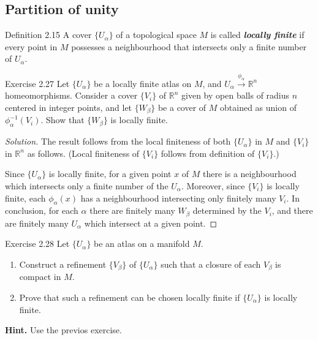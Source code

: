 \subsection{Partition of unity}

\begin{thing3}{Definition 2.15}\label{def:2.15}\leavevmode
A cover \(\{U_\alpha\}\) of a topological space \(M\) is called \textit{\textbf{locally finite}} if every point in \(M\) possesses a neighbourhood that intersects only a finite number of \(U_\alpha\).
\end{thing3}

\begin{thing4}{Exercise 2.27}\label{exer:2.27}\leavevmode
Let \(\{U_\alpha\}\) be a locally finite atlas on \(M\), and \(U_\alpha\xrightarrow{\phi_\alpha}\mathbb{R}^n\) homeomorphisms. Consider a cover \(\{V_i\}\) of \( \mathbb{R}^n\) given by open balls of radius $n$ centered in integer points, and let \(\{ W_\beta\}\) be a cover of \(M\) obtained as union of \(\phi^{-1}_\alpha(V_i)\). Show that \(\{W_\beta\}\) is locally finite.
\end{thing4}

\begin{proof}[Solution]\leavevmode
 The result follows from the local finiteness of both \(\{U_\alpha\}\) in \(M\) and \(\{V_i\}\) in \(\mathbb{R}^n\) as follows. (Local finiteness of \(\{V_i\}\) follows from definition of \(\{V_i\}\).)

Since \(\{U_\alpha\}\) is locally finite, for a given point $x$ of \(M\) there is a neighbourhood which intersects only a finite number of the \(U_\alpha\). Moreover, since  \(\{V_i\}\) is locally finite, each \(\phi_\alpha(x)\) has a neighbourhood intersecting only finitely many \(V_i\). In conclusion, for each \(\alpha\) there are finitely many \(W_\beta\) determined by the \(V_i\), and there are finitely many \(U_\alpha\) which intersect at a given point.
\end{proof}

\begin{thing4}{Exercise 2.28}\label{exer:2.28}\leavevmode
Let \(\{U_\alpha\}\) be an atlas on a manifold \(M\).
\begin{enumerate}[label=(\alph*)]
\item Construct a refinement \(\{V_\beta\}\) of \(\{U_\alpha\}\) such that a closure of each \(V_\beta\) is compact in \(M\).
\item Prove that such a refinement can be chosen locally finite if \(\{U_\alpha\}\) is locally finite.
\end{enumerate}
\textbf{Hint.} Use the previos exercise.
\end{thing4}

